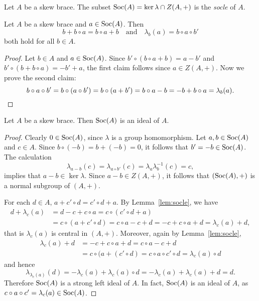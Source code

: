 \begin{definition}
	Let $A$ be a skew brace. The subset 
	$\operatorname{Soc}(A)=\ker\lambda\cap Z(A,+)$
	is the \emph{socle} of $A$.
\end{definition}

\begin{lemma}
    \label{lem:socle}
    Let $A$ be a skew brace and $a\in\operatorname{Soc}(A)$. Then 
    \[
    b+b\circ a=b\circ a+b\quad\text{and}\quad
    \lambda_b(a)=b\circ a\circ b'
    \]
    both hold 
    for all $b\in A$.
\end{lemma}

\begin{proof}
    Let $b\in A$ and $a\in\operatorname{Soc}(A)$. Since
    $b'\circ (b\circ a+b)=a-b'$ and
    $b'\circ (b+b\circ a)=-b'+a$, the first claim follows since
    $a\in Z(A,+)$.
    Now we prove the second claim:
    \[
    b\circ a\circ b'=b\circ (a\circ b')=b\circ (a+b')=b\circ a-b=-b+b\circ
    a=\lambda_b(a).\qedhere
    \]
\end{proof}

\begin{proposition}
	\label{pro:socle}
	Let $A$ be a skew brace. Then $\operatorname{Soc}(A)$ is an ideal of $A$.
	\end{proposition}

	
	\begin{proof}
		Clearly $0\in\operatorname{Soc}(A)$, since $\lambda$ is a group homomorphism. Let $a,b\in\operatorname{Soc}(A)$ and $c\in A$. Since 
		$b\circ (-b)=b+(-b)=0$, it follows that 
		$b'=-b\in\operatorname{Soc}(A)$. The calculation 
		\[
		\lambda_{a-b}(c)=\lambda_{a\circ b'}(c)=\lambda_a\lambda^{-1}_b(c)=c,
		\]
 		implies that $a-b\in\ker\lambda$. Since $a-b\in Z(A,+)$, it follows that 
        $(\operatorname{Soc}(A),+)$ is a normal subgroup of $(A,+)$. 
        
        For each $d\in A$, $a+c'\circ d=c'\circ d+a$.  By Lemma~\ref{lem:socle}, we have 
        \begin{align*}
        d+\lambda_c(a) &= d-c+c\circ a
        =c\circ (c'\circ d+a)\\
        &= c\circ (a+c'\circ d)
        = c\circ a-c+d
        = -c+c\circ a+d
        = \lambda_c(a)+d,
        \end{align*}
        that is $\lambda_c(a)$ is central in $(A,+)$. Moreover, again by Lemma~\ref{lem:socle},
        \begin{align*}
            \lambda_c(a)+d &= -c+c\circ a+d 
            = c\circ a-c+d\\
            &= c\circ (a+(c'\circ d)
            = c\circ a\circ c'\circ d=\lambda_c(a)\circ d
        \end{align*}
        and hence 
        \[
        \lambda_{\lambda_c(a)}(d)=-\lambda_c(a)+\lambda_c(a)\circ d=-\lambda_c(a)+\lambda_c(a)+d=d.
        \]
        Therefore $\operatorname{Soc}(A)$ is a strong left ideal of $A$. In fact, $\operatorname{Soc}(A)$ is an ideal of $A$,
        as $c\circ a\circ c'=\lambda_c(a)\in\operatorname{Soc}(A)$.  
	\end{proof}

